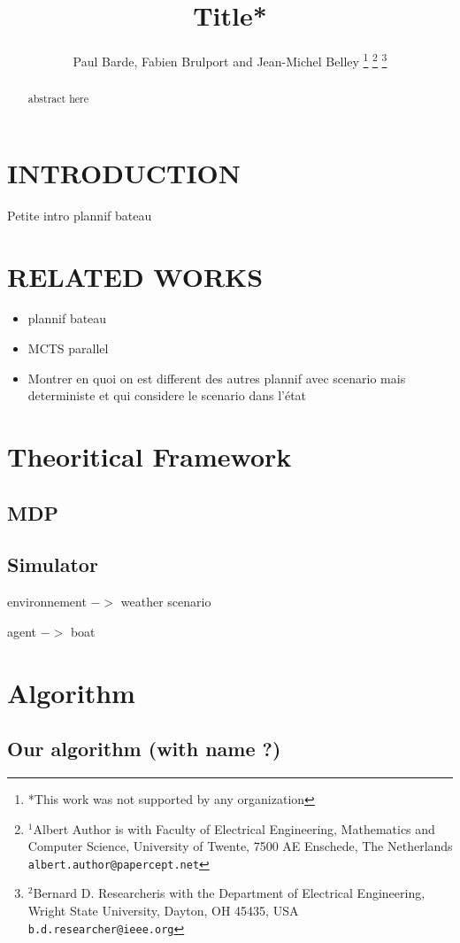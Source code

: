 \documentclass[letterpaper, 10 pt, conference]{ieeeconf}  %
\title{\LARGE \bf
Title*
}
\author{Paul Barde, Fabien Brulport and Jean-Michel Belley%
\thanks{*This work was not supported by any organization}%
\thanks{$^{1}$Albert Author is with Faculty of Electrical Engineering, Mathematics and Computer Science,
        University of Twente, 7500 AE Enschede, The Netherlands
        {\tt\small albert.author@papercept.net}}%
\thanks{$^{2}$Bernard D. Researcheris with the Department of Electrical Engineering, Wright State University,
        Dayton, OH 45435, USA
        {\tt\small b.d.researcher@ieee.org}}%
}
\begin{document}
\maketitle
\thispagestyle{empty}
\pagestyle{empty}


\begin{abstract}
abstract here

\end{abstract}


\section{INTRODUCTION}
Petite intro plannif bateau

\section{RELATED WORKS}
\begin{itemize}
\item plannif bateau
\item MCTS parallel
\item Montrer en quoi on est different des autres plannif avec scenario mais deterministe et qui considere le scenario dans l'état
\end{itemize}


\section{Theoritical Framework}
\subsection{MDP}

\subsection{Simulator}
environnement $->$ weather scenario

agent $->$ boat

\section{Algorithm}
\subsection{Our algorithm (with name ?)}
\end{document}
